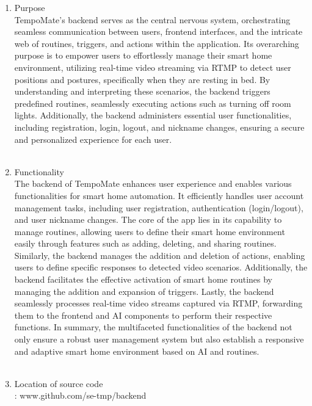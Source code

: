 \begin{enumerate}
    \item Purpose \\
          TempoMate's backend serves as the central nervous system, orchestrating seamless communication between users, frontend interfaces, and the intricate web of routines, triggers, and actions within the application. Its overarching purpose is to empower users to effortlessly manage their smart home environment, utilizing real-time video streaming via RTMP to detect user positions and postures, specifically when they are resting in bed. By understanding and interpreting these scenarios, the backend triggers predefined routines, seamlessly executing actions such as turning off room lights. Additionally, the backend administers essential user functionalities, including registration, login, logout, and nickname changes, ensuring a secure and personalized experience for each user. \\\\

    \item Functionality \\
          The backend of TempoMate enhances user experience and enables various functionalities for smart home automation. It efficiently handles user account management tasks, including user registration, authentication (login/logout), and user nickname changes. The core of the app lies in its capability to manage routines, allowing users to define their smart home environment easily through features such as adding, deleting, and sharing routines. Similarly, the backend manages the addition and deletion of actions, enabling users to define specific responses to detected video scenarios. Additionally, the backend facilitates the effective activation of smart home routines by managing the addition and expansion of triggers. Lastly, the backend seamlessly processes real-time video streams captured via RTMP, forwarding them to the frontend and AI components to perform their respective functions. In summary, the multifaceted functionalities of the backend not only ensure a robust user management system but also establish a responsive and adaptive smart home environment based on AI and routines. \\\\

    \item Location of source code \\
          : www.github.com/se-tmp/backend \\\\


\end{enumerate}
